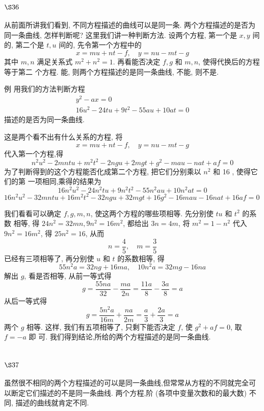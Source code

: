 \section{$\S 36$}

从前面所讲我们看到, 不同方程描述的曲线可以是同一条. 两个方程描述的是否为 同一条曲线, 怎样判断呢? 这里我们讲一种判断方法. 设两个方程, 第一个是 $x, y$ 间的, 第二个是 $t, u$ 间的, 先令第一个方程中的
\[
x=m u+n t-f, \quad y=n u-m t-g
\]
其中 $m, n$ 满足关系式 $m^{2}+n^{2}=1$. 再看能否决定 $f, g$ 和 $m, n$, 使得代换后的方程等于第二 个方程. 能, 则两个方程描述的是同一条曲线, 不能, 则不是.

例 用我们的方法判断方程
\[
\begin{gathered}
y^{2}-a x=0 \\
16 u^{2}-24 t u+9 t^{2}-55 a u+10 a t=0
\end{gathered}
\]
描述的是否为同一条曲线.

这是两个看不出有什么关系的方程, 将
\[
x=m u+n t-f, \quad y=n u-m t-g
\]
代入第一个方程,得
\[
n^{2} u^{2}-2 m n t u+m^{2} t^{2}-2 n g u+2 m g t+g^{2}-m a u-n a t+a f=0
\]
为了判断得到的这个方程能否化成第二个方程, 把它们分别乘以 $n^{2}$ 和 16 , 使得它们的第 一项相同,乘得的结果为
\[
16 n^{2} u^{2}-24 n^{2} t u+9 n^{2} t^{2}-55 n^{2} a u+10 n^{2} a t=0
\]
$16 n^{2} u^{2}-32 m n t u+16 m^{2} t^{2}-32 n g u+32 m g t+16 g^{2}-16 m a u-16 n a t+16 a f=0$

我们看看可以确定 $f, g, m, n$, 使这两个方程的哪些项相等. 先分别使 $t u$ 和 $t^{2}$ 的系数 相等, 得 $24 n^{2}=32 m n, 9 n^{2}=16 m^{2}$, 都给出 $3 n=4 m$, 将 $m^{2}=1-n^{2}$ 代入 $9 n^{2}=16 m^{2}$, 得 $25 n^{2}=16$, 从而
\[
n=\frac{4}{5}, \quad m=\frac{3}{5}
\]
已经有三项相等了, 再分别使 $u$ 和 $t$ 的系数相等, 得
\[
55 n^{2} a=32 n g+16 m a, \quad 10 n^{2} a=32 m g-16 n a
\]
解出 $g$, 看是否相等, 从前一等式得
\[
g=\frac{55 n a}{32}-\frac{m a}{2 n}=\frac{11 a}{8}-\frac{3 a}{8}=a
\]
从后一等式得
\[
g=\frac{5 n^{2} a}{16 m}+\frac{n a}{2 m}=\frac{a}{3}+\frac{2 a}{3}=a
\]
两个 $g$ 相等. 这样, 我们有五项相等了, 只剩下能否决定 $f$, 使 $g^{2}+a f=0$, 取 $f=-a$ 即 可. 我们得到结论,所给的两个方程描述的是同一条曲线.

\section{$\S 37$}

虽然很不相同的两个方程描述的可以是同一条曲线,但常常从方程的不同就完全可 以断定它们描述的不是同一条曲线. 两个方程,阶 (各项中变量次数和的最大数) 不同, 描述的曲线就肯定不同.

